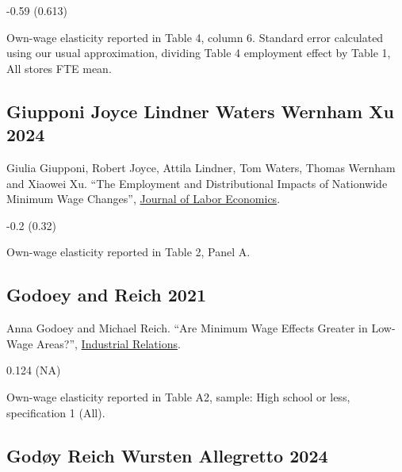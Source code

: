  -0.59 (0.613)

\vspace{0.7em}

 Own-wage elasticity reported in Table 4, column 6. Standard error calculated using our usual approximation, dividing Table 4 employment effect by Table 1, All stores FTE mean.

\subsection*{Giupponi Joyce Lindner Waters Wernham Xu 2024}
\vspace{-0.7em}

\noindent Giulia Giupponi, Robert Joyce, Attila Lindner, Tom Waters, Thomas Wernham and Xiaowei Xu. ``The Employment and Distributional Impacts of Nationwide Minimum Wage Changes'', \href{https://doi.org/10.1086/728471}{Journal of Labor Economics}.

\vspace{0.7em}

 -0.2 (0.32)

\vspace{0.7em}

 Own-wage elasticity reported in Table 2, Panel A.

\subsection*{Godoey and Reich 2021}
\vspace{-0.7em}

\noindent Anna Godoey and Michael Reich. ``Are Minimum Wage Effects Greater in Low-Wage Areas?'', \href{https://doi.org/10.1111/irel.12267}{Industrial Relations}.

\vspace{0.7em}

 0.124 (NA)

\vspace{0.7em}

 Own-wage elasticity reported in Table A2, sample: High school or less, specification 1 (All).

\subsection*{Godøy Reich Wursten Allegretto 2024}
\vspace{-0.7em}


